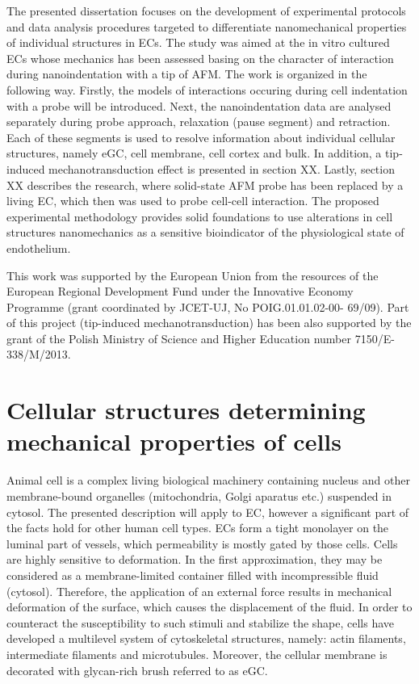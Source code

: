 The presented dissertation focuses on the development of experimental protocols and data analysis procedures targeted to differentiate nanomechanical properties of individual structures in \glspl{EC}. The study was aimed at the in vitro cultured \glspl{EC} whose mechanics has been assessed basing on the character of interaction during nanoindentation with a tip of \gls{AFM}. The work is organized in the following way. Firstly, the models of interactions occuring during cell indentation with a probe will be introduced. Next, the nanoindentation data are analysed separately during probe approach, relaxation (pause segment) and retraction. Each of these segments is used to resolve information about individual cellular structures, namely \gls{eGC}, cell membrane, cell cortex and bulk. In addition, a tip-induced mechanotransduction effect is presented in section XX. Lastly, section XX describes the research, where solid-state \gls{AFM} probe has been replaced by a living \gls{EC}, which then was used to probe cell-cell interaction. The proposed experimental methodology provides solid foundations to use alterations in cell structures nanomechanics as a sensitive bioindicator of the physiological state of endothelium. 


This work was supported by the European Union from the resources of the European Regional Development Fund under the Innovative Economy Programme (grant coordinated by JCET-UJ, No POIG.01.01.02-00- 69/09). Part of this project (tip-induced mechanotransduction) has been also supported by the grant of the Polish Ministry of Science and Higher Education number 7150/E-338/M/2013.


\section{Cellular structures determining mechanical properties of cells}\label{sec:cellular_structures}
Animal cell is a complex living biological machinery containing nucleus and other membrane-bound organelles (mitochondria, Golgi aparatus etc.) suspended in cytosol. The presented description will apply to \gls{EC}, however a significant part of the facts hold for other human cell types. \Glspl{EC} form a tight monolayer on the luminal part of vessels, which permeability is mostly gated by those cells. Cells are highly sensitive to deformation. In the first approximation, they may be considered as a membrane-limited container filled with incompressible fluid (cytosol). Therefore, the application of an external force results in mechanical deformation of the surface, which causes the displacement of the fluid. In order to counteract the susceptibility to such stimuli and stabilize the shape, cells have developed a multilevel system of cytoskeletal structures, namely: actin filaments, intermediate filaments and microtubules. Moreover, the cellular membrane is decorated with glycan-rich brush referred to as \gls{eGC}.


